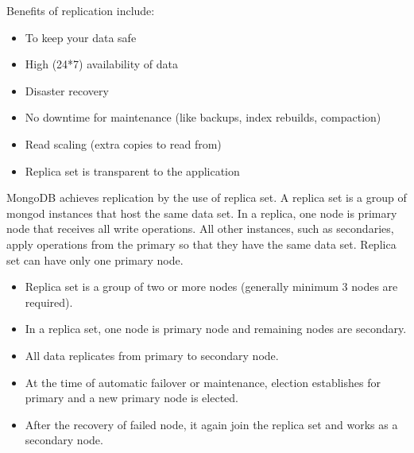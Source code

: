 \documentclass[12pt]{article}
\begin{document}
\begin{bashcode}
\begin{bashcode}
Benefits of replication include:
\begin{itemize}
  \item To keep your data safe
  \item High (24*7) availability of data
  \item Disaster recovery
  \item No downtime for maintenance (like backups, index rebuilds, compaction)
  \item Read scaling (extra copies to read from)
  \item Replica set is transparent to the application
\end{itemize}

MongoDB achieves replication by the use of replica set. A replica set is
a group of mongod instances that host the same data set. In a replica,
one node is primary node that receives all write operations. All other
instances, such as secondaries, apply operations from the primary so
that they have the same data set. Replica set can have only one primary
node.

\begin{itemize}
  \item Replica set is a group of two or more nodes (generally minimum 3 nodes are required).
  \item In a replica set, one node is primary node and remaining nodes are secondary.
  \item All data replicates from primary to secondary node.
  \item At the time of automatic failover or maintenance, election
    establishes for primary and a new primary node is elected.
   \item After the recovery of failed node, it again join the replica
     set and works as a secondary node.
\end{itemize}


\end{bashcode}
\end{bashcode}
\end{document}
